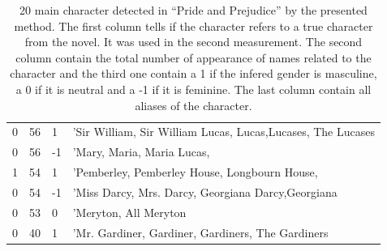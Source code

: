 \documentclass[a4paper, 12pt]{report}
\begin{document}
\begin{table}[]
{\begin{tabular}{|l|l|l|l|}
0  & 56  & 1  & 'Sir William, Sir William Lucas, Lucas,Lucases, The Lucases\\
0  & 56  & -1 & 'Mary, Maria, Maria Lucas,                                       \\
1  & 54  & 1  & 'Pemberley, Pemberley House, Longbourn House,                    \\
0  & 54  & -1 & 'Miss Darcy, Mrs. Darcy, Georgiana Darcy,Georgiana              \\
0  & 53  & 0  & 'Meryton, All Meryton                                     \\
0  & 40  & 1  & 'Mr. Gardiner, Gardiner, Gardiners, The Gardiners                \\
\hline
\end{tabular}
}
\caption{20 main character detected in ``Pride and Prejudice'' by the presented method. The first column tells if the character refers to a true character from the novel. It was used in the second measurement. The second column contain the total number of appearance of names related to the character and the third one contain a 1 if the infered gender is masculine, a 0 if it is neutral and a -1 if it is feminine. The last column contain all aliases of the character. }


\end{table}
\end{document}
